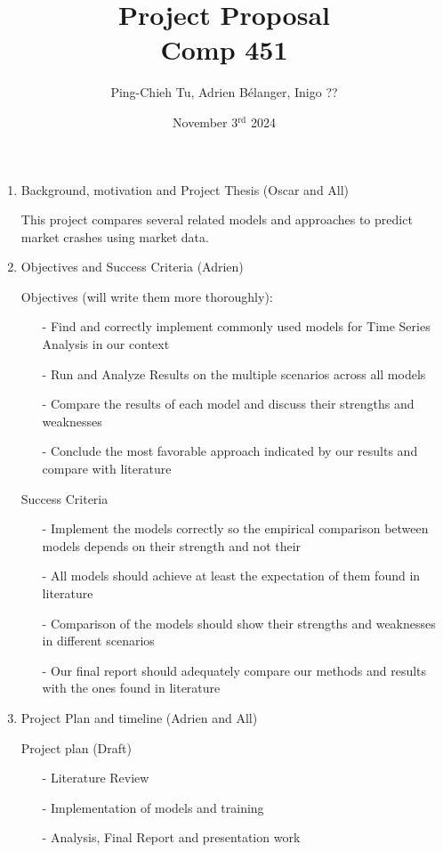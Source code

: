 \documentclass[12pt, letterpaper]{article}
\title{
  Project Proposal \\
  \Large Comp 451}
\author{Ping-Chieh Tu, Adrien Bélanger, Inigo ??}
\date{November 3$^{\text{rd}}$ 2024}
\begin{document}
\maketitle 

\begin{enumerate}
    \item Background, motivation and Project Thesis (Oscar and All)
    
    This project compares several related models and approaches to predict market crashes using market data.
    
    \item Objectives and Success Criteria (Adrien)
    
        Objectives (will write them more thoroughly):
        \begin{itemize}
            \item[-] Find and correctly implement commonly used models for Time Series Analysis in our context
            \item[-] Run and Analyze Results on the multiple scenarios across all models
            \item[-] Compare the results of each model and discuss their strengths and weaknesses
            \item[-] Conclude the most favorable approach indicated by our results and compare with literature
        \end{itemize} 
        Success Criteria
        \begin{itemize}
            \item [-] Implement the models correctly so the empirical comparison between models depends on their strength and not their
            \item [-] All models should achieve at least the expectation of them found in literature
            \item [-] Comparison of the models should show their strengths and weaknesses in different scenarios
            \item [-] Our final report should adequately compare our methods and results with the ones found in literature
        \end{itemize}
        
    \item Project Plan and timeline (Adrien and All)
        
        Project plan (Draft)
        \begin{itemize}
            \item [-] Literature Review
            \item [-] Implementation of models and training
            \item [-] Analysis, Final Report and presentation work
        \end{itemize}
    

\end{enumerate}
\end{document}
